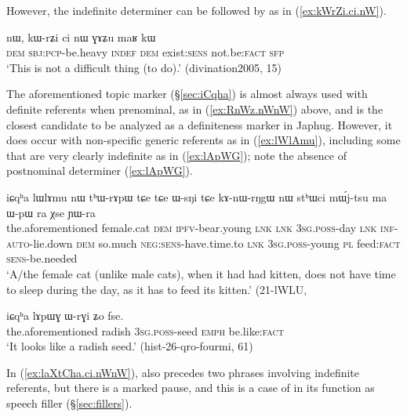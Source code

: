 However, the indefinite determiner  can be followed by  as in (\ref{ex:kWrZi.ci.nW}).

\begin{exe}
\ex \label{ex:kWrZi.ci.nW}
\gll nɯ, kɯ-rʑi ci nɯ ɣɤʑu maʁ kɯ \\
\textsc{dem} \textsc{sbj}:\textsc{pcp}-be.heavy \textsc{indef} \textsc{dem} exist:\textsc{sens} not.be:\textsc{fact} \textsc{sfp} \\
\glt `This is not a difficult thing (to do).' (divination2005, 15)
\end{exe}

The aforementioned topic marker  (§\ref{sec:iCqha}) is almost always used with definite referents when prenominal, as in (\ref{ex:RnWz.nWnW}) above, and is the closest candidate to be analyzed as a definiteness marker in Japhug. However, it does occur with non-specific generic referents as in (\ref{ex:lWlAmu}), including some that are very clearly indefinite as in (\ref{ex:lApWG}); note the absence of postnominal determiner  (\ref{ex:lApWG}).

\begin{exe}
\ex \label{ex:lWlAmu}
 \gll iɕqʰa lɯlɤmu nɯ tʰɯ-rɤpɯ tɕe tɕe ɯ-sŋi tɕe kɤ-nɯ-rŋgɯ nɯ stʰɯci mɯ́j-tsu ma ɯ-pɯ ra χse ɲɯ-ra   \\
 the.aforementioned female.cat \textsc{dem} \textsc{ipfv}-bear.young \textsc{lnk} \textsc{lnk} \textsc{3sg}.\textsc{poss}-day \textsc{lnk} \textsc{inf}-\textsc{auto}-lie.down \textsc{dem} so.much \textsc{neg}:\textsc{sens}-have.time.to \textsc{lnk} \textsc{3sg}.\textsc{poss}-young \textsc{pl} feed:\textsc{fact} \textsc{sens}-be.needed \\
 \glt `A/the female cat (unlike male cats), when it had had kitten, does not have time to sleep during the day, as it has to feed its kitten.' (21-lWLU, 
\end{exe}

\begin{exe}
\ex \label{ex:lApWG}
\gll  iɕqʰa lɤpɯɣ ɯ-rɣi ʑo fse. \\
the.aforementioned radish \textsc{3sg}.\textsc{poss}-seed \textsc{emph} be.like:\textsc{fact} \\
\glt `It looks like a radish seed.' (hist-26-qro-fourmi, 61)
\end{exe}

In  (\ref{ex:laXtCha.ci.nWnW}),   also precedes two phrases involving indefinite referents, but  there is a marked pause, and this is a case of  in its function as speech filler (§\ref{sec:fillers}).

